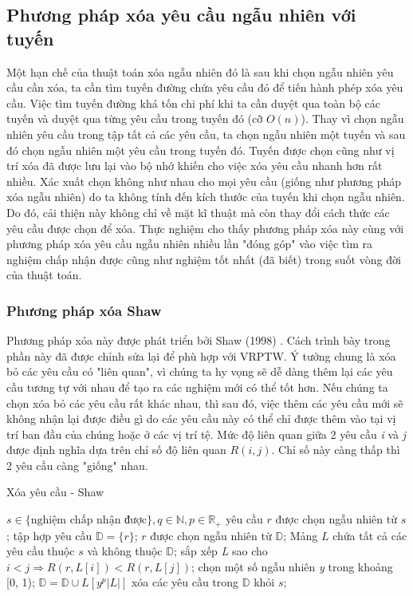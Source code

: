 \subsection*{Phương pháp xóa yêu cầu ngẫu nhiên với tuyến}
Một hạn chế của thuật toán xóa ngẫu nhiên đó là sau khi chọn ngẫu nhiên yêu cầu cần xóa, ta cần tìm tuyến đường chứa yêu cầu đó để tiến hành phép xóa yêu cầu. Việc tìm tuyến đường khá tốn chi phí khi ta cần duyệt qua toàn bộ các tuyến và duyệt qua từng yêu cầu trong tuyến đó (cỡ $O(n)$). Thay vì chọn ngẫu nhiên yêu cầu trong tập tất cả các yêu cầu, ta chọn ngẫu nhiên một tuyến và sau đó chọn ngẫu nhiên một yêu cầu trong tuyến đó. Tuyến được chọn cũng như vị trí xóa đã được lưu lại vào bộ nhớ khiến cho việc xóa yêu cầu nhanh hơn rất nhiều. Xác xuất chọn không như nhau cho mọi yêu cầu (giống như phương pháp xóa ngẫu nhiên) do ta không tính đến kích thước của tuyến khi chọn ngẫu nhiên. Do đó, cải thiện này không chỉ về mặt kĩ thuật mà còn thay đổi cách thức các yêu cầu được chọn để xóa. Thực nghiệm cho thấy phương pháp xóa này cùng với phương pháp xóa yêu cầu ngẫu nhiên nhiều lần "đóng góp" vào việc tìm ra nghiệm chấp nhận được cũng như nghiệm tốt nhất (đã biết) trong suốt vòng đời của thuật toán.

\subsubsection*{Phương pháp xóa Shaw}
Phương pháp xóa này được phát triển bởi Shaw (1998) \cite{shaw1998using}. Cách trình bày trong phần này đã được chỉnh sửa lại để phù hợp với VRPTW. Ý tưởng chung là xóa bỏ các yêu cầu có "liên quan", vì chúng ta hy vọng sẽ dễ dàng thêm lại các yêu cầu tương tự với nhau để tạo ra các nghiệm mới có thể tốt hơn. Nếu chúng ta chọn xóa bỏ các yêu cầu rất khác nhau, thì sau đó, việc thêm các yêu cầu mới sẽ không nhận lại được điều gì do các yêu cầu này có thể chỉ được thêm vào tại vị trí ban đầu của chúng hoặc ở các vị trí tệ. Mức độ liên quan giữa 2 yêu cầu \textit{i} và \textit{j} được định nghĩa dựa trên chỉ số độ liên quan $R(i,j)$. Chỉ số này càng thấp thì 2 yêu cầu càng "giống" nhau.

\begin{algorithm}
	\caption{Xóa yêu cầu - Shaw}
	\begin{algorithmic}[1]
		\Require $s \in \text{\{nghiệm chấp nhận được\}}, q \in \mathbb{N}, p \in \mathbb{R}_{+}$
		\State yêu cầu $r$ được chọn ngẫu nhiên từ $s$;
		\State tập hợp yêu cầu $\mathbb{D}=\{r\}$;
		\State $r$ được chọn ngẫu nhiên từ $\mathbb{D}$;
		\State Mảng $L$ chứa tất cả các yêu cầu thuộc $s$ và không thuộc $\mathbb{D}$;
		\State sắp xếp \textit{L} sao cho $i<j \Rightarrow R(r, L\left[ i \right]) < R(r, L\left[ j \right])$;
		\State chọn một số ngẫu nhiên \textit{y} trong khoảng [0, 1);
		\State $\mathbb{D}=\mathbb{D}\cup {L \left[ y^p|L| \right]}$
		\EndWhile
		\State xóa các yêu cầu trong $\mathbb{D}$ khỏi $s$;
	\end{algorithmic}
\end{algorithm}

